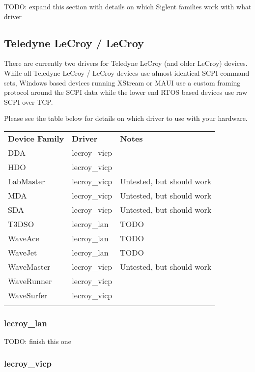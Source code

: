 TODO: expand this section with details on which Siglent families work with what driver

\subsection{Teledyne LeCroy / LeCroy}

There are currently two drivers for Teledyne LeCroy (and older LeCroy) devices. While all Teledyne LeCroy / LeCroy
devices use almost identical SCPI command sets, Windows based devices running XStream or MAUI use a custom framing
protocol around the SCPI data while the lower end RTOS based devices use raw SCPI over TCP.

Please see the table below for details on which driver to use with  your hardware.

\begin{tabularx}{16cm}{llX}
\thickhline
\textbf{Device Family} & \textbf{Driver} & \textbf{Notes} \\
\thickhline
DDA & lecroy\_vicp & \\
\thickhline
HDO & lecroy\_vicp & \\
\thickhline
LabMaster & lecroy\_vicp & Untested, but should work\\
\thickhline
MDA & lecroy\_vicp &  Untested, but should work\\
\thickhline
SDA & lecroy\_vicp &  Untested, but should work\\
\thickhline
T3DSO & lecroy\_lan & TODO \\
\thickhline
WaveAce & lecroy\_lan & TODO \\
\thickhline
WaveJet & lecroy\_lan & TODO \\
\thickhline
WaveMaster & lecroy\_vicp & Untested, but should work \\
\thickhline
WaveRunner & lecroy\_vicp &  \\
\thickhline
WaveSurfer & lecroy\_vicp &  \\
\thickhline
\end{tabularx}

\subsubsection{lecroy\_lan}

TODO: finish this one

\subsubsection{lecroy\_vicp}

